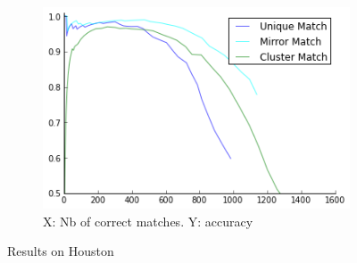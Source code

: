 \documentclass{article}
\begin{document}
\begin{figure}
{\begin{subfigure}[t]{0.35\textwidth}
			\centering
			\includegraphics[width=\textwidth]{images/result_houston}
			\caption{X: Nb of correct matches. Y: accuracy}
			\label{fig:result_houston}
		\end{subfigure}%
	}%
	\label{fig:houston}
	\caption{Results on Houston}
\end{figure}
\end{document}
